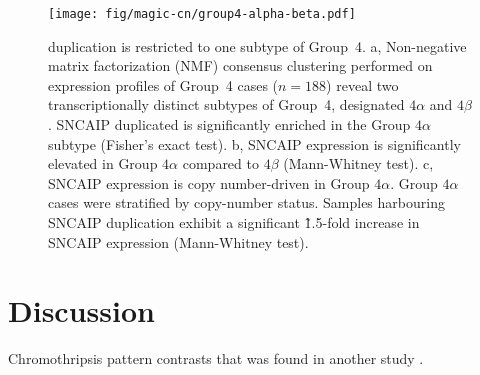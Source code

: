 \begin{figure}[b]
	\begin{center}
		\texttt{[image: fig/magic-cn/group4-alpha-beta.pdf]}
	\end{center}
	\caption[ duplication is restricted to one subtype of Group~4]
	{
	 duplication is restricted to one subtype of Group~4.
	\textsf{a}, Non-negative matrix factorization (NMF) consensus clustering performed on expression profiles of Group~4 cases ($n = 188$) reveal two transcriptionally distinct subtypes of Group~4, designated $4\alpha$ and $4\beta$. SNCAIP duplicated is significantly enriched in the Group $4\alpha$ subtype (Fisher's exact test).
	\textsf{b}, SNCAIP expression is significantly elevated in Group $4\alpha$ compared to $4\beta$ (Mann-Whitney test).
	\textsf{c}, SNCAIP expression is copy number-driven in Group $4\alpha$. Group $4\alpha$ cases were stratified by  copy-number status. Samples harbouring SNCAIP duplication exhibit a significant \~1.5-fold increase in SNCAIP expression (Mann-Whitney test).
	}
	\label{fig:group4-alpha-beta}
\end{figure}

\clearpage

\section{Discussion}

Chromothripsis pattern contrasts that was found in another study .

